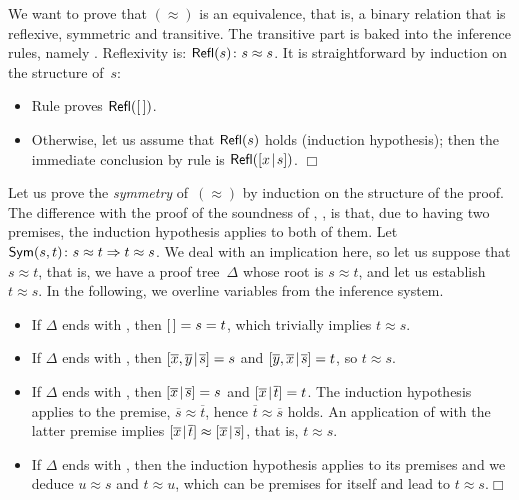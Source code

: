 We want to prove that \((\approx)\) is an equivalence, that is, a
binary relation that is reflexive, symmetric and transitive. The
transitive part is baked into the inference rules, namely
. Reflexivity is:
\(\textsf{Refl}({s}) \colon s \approx s\).
It is straightforward by induction on the
structure of~\(s\):
\begin{itemize}

  \item Rule  proves \(\textsf{Refl}({[\,]})\).

  \item Otherwise, let us assume that \(\textsf{Refl}({s})\) holds
    (induction hypothesis); then the immediate conclusion by rule
     is \(\textsf{Refl}({[{x}\!\mid\!{s}]})\). \hfill\(\Box\)

\end{itemize}

Let us prove the \emph{symmetry} of~\((\approx)\) by
induction on the structure of the proof. The
difference with the proof of the soundness of
, , is that,
due to  having two premises, the induction hypothesis
applies to both of them. Let
\(\textsf{Sym}({s,t}) \colon s \approx t \Rightarrow t \approx s\). We
deal with an implication here, so let us suppose that \(s \approx t\),
that is, we have a proof tree~\(\Delta\) whose root is \(s \approx
t\), and let us establish \(t \approx s\). In the following, we
overline variables from the inference system.
\begin{itemize}

  \item If \(\Delta\) ends with , then \([\,] = s = t\),
    which trivially implies \(t \approx s\).

  \item If \(\Delta\) ends with , then
    \([{\overline{x},\overline{y}}\!\mid\!{\overline{s}}] = s\) and
    \([{\overline{y},\overline{x}}\!\mid\!{\overline{s}}] = t\), so \(t
    \approx s\).

  \item If \(\Delta\) ends with , then
    \([{\overline{x}}\!\mid\!{\overline{s}}] = s\) and
    \([{\overline{x}}\!\mid\!{\overline{t}}] = t\). The induction
    hypothesis applies to the premise, \(\overline{s} \approx
    \overline{t}\), hence \(\overline{t} \approx \overline{s}\)
    holds. An application of  with the latter premise
    implies \([{\overline{x}}\!\mid\!{\overline{t}}] \approx
    [{\overline{x}}\!\mid\!{\overline{s}}]\), that is, \(t \approx s\).

  \item If \(\Delta\) ends with , then the induction
    hypothesis applies to its prem\-ises and we deduce \(u \approx s\)
    and \(t \approx u\), which can be premises for 
    itself and lead to \(t \approx s\).\hfill\(\Box\)

\end{itemize}

